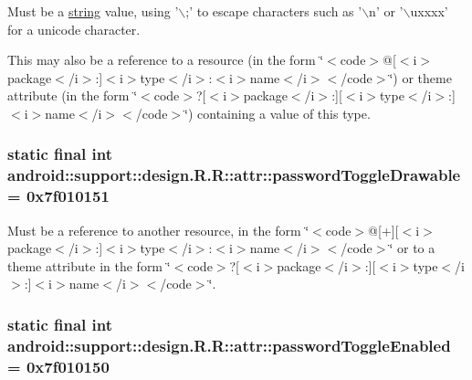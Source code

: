 Must be a \hyperlink{classandroid_1_1support_1_1design_1_1_r_1_1string}{string} value, using '$\backslash$;' to escape characters such as '$\backslash$n' or '$\backslash$uxxxx' for a unicode character. 

This may also be a reference to a resource (in the form \char`\"{}$<$code$>$@\mbox{[}$<$i$>$package$<$/i$>$:\mbox{]}$<$i$>$type$<$/i$>$:$<$i$>$name$<$/i$>$$<$/code$>$\char`\"{}) or theme attribute (in the form \char`\"{}$<$code$>$?\mbox{[}$<$i$>$package$<$/i$>$:\mbox{]}\mbox{[}$<$i$>$type$<$/i$>$:\mbox{]}$<$i$>$name$<$/i$>$$<$/code$>$\char`\"{}) containing a value of this type. \hypertarget{classandroid_1_1support_1_1design_1_1_r_1_1attr_2f7f5c6f2cb42f4aa7a7c3aa5602ea45}{
\subsubsection[{passwordToggleDrawable}]{\setlength{\rightskip}{0pt plus 5cm}static final int android::support::design.R.R::attr::passwordToggleDrawable = 0x7f010151}}
\label{classandroid_1_1support_1_1design_1_1_r_1_1attr_2f7f5c6f2cb42f4aa7a7c3aa5602ea45}


Must be a reference to another resource, in the form \char`\"{}$<$code$>$@\mbox{[}+\mbox{]}\mbox{[}$<$i$>$package$<$/i$>$:\mbox{]}$<$i$>$type$<$/i$>$:$<$i$>$name$<$/i$>$$<$/code$>$\char`\"{} or to a theme attribute in the form \char`\"{}$<$code$>$?\mbox{[}$<$i$>$package$<$/i$>$:\mbox{]}\mbox{[}$<$i$>$type$<$/i$>$:\mbox{]}$<$i$>$name$<$/i$>$$<$/code$>$\char`\"{}. \hypertarget{classandroid_1_1support_1_1design_1_1_r_1_1attr_e73fe64eb9604a033e48c3b8da0271fe}{
\subsubsection[{passwordToggleEnabled}]{\setlength{\rightskip}{0pt plus 5cm}static final int android::support::design.R.R::attr::passwordToggleEnabled = 0x7f010150}}
\label{classandroid_1_1support_1_1design_1_1_r_1_1attr_e73fe64eb9604a033e48c3b8da0271fe}


